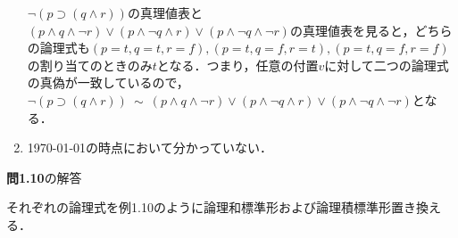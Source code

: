 \documentclass[11pt,dvipdfmx]{jreport}
\begin{document}
\begin{enumerate}
$\lnot(p \supset (q \land r))$の真理値表と$(p \land q \land \lnot r) \lor (p \land \lnot q \land r) \lor (p \land \lnot q \land \lnot r)$の真理値表を見ると，どちらの論理式も$(p = t, q = t, r = f), (p = t, q = f, r = t), (p = t, q = f, r = f)$の割り当てのときのみ$t$となる．つまり，任意の付置$v$に対して二つの論理式の真偽が一致しているので，$\lnot(p \supset (q \land r)) \ \sim \ (p \land q \land \lnot r) \lor (p \land \lnot q \land r) \lor (p \land \lnot q \land \lnot r)$となる．
\item \today の時点において分かっていない．
\end{enumerate}

\vspace{5mm}
\par

\noindent \textbf{問1.10}の解答
\par
それぞれの論理式を例1.10のように論理和標準形および論理積標準形置き換える．
\end{document}
